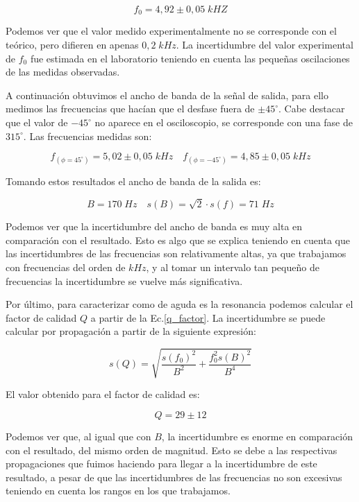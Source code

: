 \documentclass[a4paper,12pt,titlepage]{article}
\begin{document}
\begin{equation}
    f_0 = 4,92 \pm 0,05 \; kHZ
\end{equation}

Podemos ver que el valor medido experimentalmente no se corresponde con el teórico, pero difieren en apenas $0,2 \; kHz$. La incertidumbre del valor experimental de $f_0$ fue estimada en el laboratorio teniendo en cuenta las pequeñas oscilaciones de las medidas observadas.

A continuación obtuvimos el ancho de banda de la señal de salida, para ello medimos las frecuencias que hacían que el desfase fuera de $\pm 45^{\circ}$. Cabe destacar que el valor de $-45^{\circ}$ no aparece en el osciloscopio, se corresponde con una fase de $315^{\circ}$. Las frecuencias medidas son:

\begin{equation}
    f_{(\phi=45^{\circ})} = 5,02 \pm 0,05 \; kHz \quad f_{(\phi=-45^{\circ})} = 4,85 \pm 0,05 \; kHz
\end{equation}

Tomando estos resultados el ancho de banda de la salida es:

\begin{equation}
    B = 170 \; Hz \quad s(B) = \sqrt{2}\cdot s(f) = 71 \;Hz
\end{equation}

Podemos ver que la incertidumbre del ancho de banda es muy alta en comparación con el resultado. Esto es algo que se explica teniendo en cuenta que las incertidumbres de las frecuencias son relativamente altas, ya que trabajamos con frecuencias del orden de $kHz$, y al tomar un intervalo tan pequeño de frecuencias la incertidumbre se vuelve más significativa.

Por último, para caracterizar como de aguda es la resonancia podemos calcular el factor de calidad $Q$ a partir de la Ec.\ref{q_factor}. La incertidumbre se puede calcular por propagación a partir de la siguiente expresión:

\begin{equation}
    s(Q) = \sqrt{\frac{s(f_0)^2}{B^2} + \frac{f_0^2 s(B)^2}{B^4}}
\end{equation}

El valor obtenido para el factor de calidad es:

\begin{equation}
    Q = 29 \pm 12
\end{equation}

Podemos ver que, al igual que con $B$, la incertidumbre es enorme en comparación con el resultado, del mismo orden de magnitud. Esto se debe a las respectivas propagaciones que fuimos haciendo para llegar a la incertidumbre de este resultado, a pesar de que las incertidumbres de las frecuencias no son excesivas teniendo en cuenta los rangos en los que trabajamos.
\end{document}
